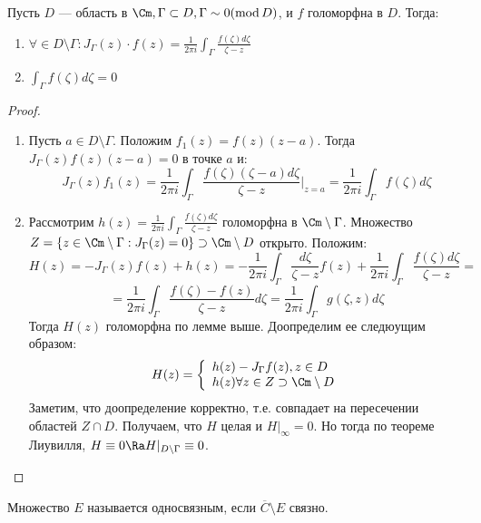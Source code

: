 \begin{theorem}
    Пусть \(D\) --- область в \(\Cm, \Gamma \subset D, \Gamma \sim 0 (\operatorname{mod} D)\), и \(f\) голоморфна в \(D\). Тогда:
    \begin{enumerate}
        \item \(\forall \in D \setminus \Gamma: J_\Gamma(z)\cdot f(z) = \frac{1}{2\pi i} \int_\Gamma \frac{f(\zeta)d\zeta}{\zeta - z}\)
        \item \(\int_\Gamma f(\zeta)d\zeta = 0\)
    \end{enumerate}
\end{theorem}
\begin{proof}\indent
    \begin{enumerate}
        \item[\((1) \Ra (2)\)] Пусть \(a \in D \setminus \Gamma\). Положим \(f_1(z) = f(z)(z - a)\). Тогда \(J_\Gamma(z)f(z)(z - a) = 0\) в точке \(a\) и:
        \[J_\Gamma(z)f_1(z) = \frac{1}{2\pi i}\int_\Gamma \frac{f(\zeta)(\zeta - a)d\zeta}{\zeta - z}\bigg|_{z = a} = \frac{1}{2\pi i}\int_\Gamma f(\zeta)d\zeta\]
        \item[\((2) \Ra (1)\)] Рассмотрим \(h(z) = \frac{1}{2\pi i}\int_\Gamma \frac{f(\zeta)d\zeta}{\zeta - z}\) голоморфна в \(\Cm \setminus \Gamma\). Множество \(Z = \{z \in \Cm \setminus \Gamma: J_\Gamma(z) = 0\} \supset \Cm \setminus D\) открыто. Положим:
        \[H(z) = -J_\Gamma(z)f(z) + h(z) = -\frac{1}{2\pi i}\int_{\Gamma}\frac{d\zeta}{\zeta - z}f(z) + \frac{1}{2\pi i}\int_\Gamma \frac{f(\zeta)d\zeta}{\zeta - z} = \]
        \[= \frac{1}{2\pi i}\int_\Gamma \frac{f(\zeta) - f(z)}{\zeta - z}d\zeta = \frac{1}{2\pi i}\int_\Gamma g(\zeta, z)d\zeta\]
        Тогда \(H(z)\) голоморфна по лемме выше. Доопределим ее следюущим образом:
        \[H(z) = \left\{\begin{array}{l}
            h(z) - J_\Gamma f(z), z \in D \\
            h(z) \forall z \in Z \supset \Cm \setminus D
        \end{array}\right.\]
        Заметим, что доопределение корректно, т.е. совпадает на пересечении областей \(Z \cap D\). Получаем, что \(H\) целая и \(H|_\infty = 0\). Но тогда по теореме Лиувилля, \(H \equiv 0 \Ra H|_{D \setminus \Gamma} \equiv 0\).
    \end{enumerate}
\end{proof}

\begin{definition}
    Множество \(E\) называется односвязным, если \(\overline{C} \setminus E\) связно.
\end{definition}

